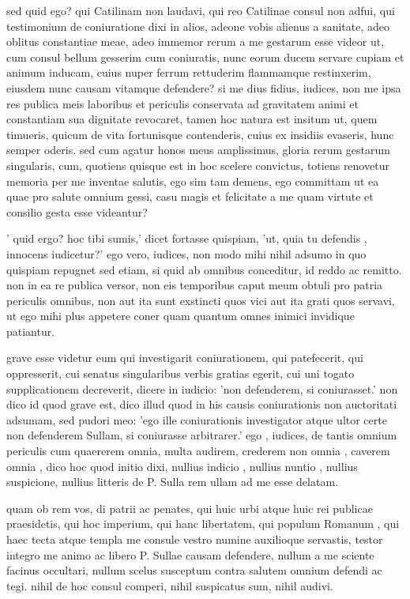  sed quid ego? qui Catilinam non laudavi, qui reo Catilinae consul non adfui, qui testimonium de coniuratione dixi in alios, adeone vobis alienus a sanitate, adeo oblitus constantiae meae, adeo immemor rerum a me gestarum esse videor ut, cum consul bellum gesserim cum coniuratis, nunc eorum ducem servare cupiam et animum inducam, cuius nuper ferrum rettuderim flammamque restinxerim, eiusdem nunc causam vitamque defendere? si me dius fidius, iudices, non me ipsa res publica meis laboribus et periculis conservata ad gravitatem animi et constantiam sua dignitate revocaret, tamen hoc natura est insitum ut, quem timueris, quicum de vita fortunisque contenderis, cuius ex insidiis evaseris, hunc semper oderis. sed cum agatur honos meus amplissimus, gloria rerum gestarum singularis, cum, quotiens quisque est in hoc scelere convictus, totiens renovetur memoria per me inventae salutis, ego sim tam demens, ego committam ut ea quae pro salute omnium gessi, casu magis et felicitate a me quam virtute et consilio gesta esse videantur?

 ' quid ergo? hoc tibi sumis,' dicet fortasse quispiam, 'ut, quia tu defendis , innocens iudicetur?' ego vero, iudices, non modo mihi nihil adsumo in quo quispiam repugnet sed etiam, si quid ab omnibus conceditur, id reddo ac remitto. non in ea re publica versor, non eis temporibus caput meum obtuli pro patria periculis omnibus, non aut ita sunt exstincti quos vici aut ita grati quos servavi, ut ego mihi plus appetere coner quam quantum omnes inimici invidique patiantur.

 grave esse videtur eum qui investigarit coniurationem, qui patefecerit, qui oppresserit, cui senatus singularibus verbis gratias egerit, cui uni togato supplicationem decreverit, dicere in iudicio: 'non defenderem, si coniurasset.' non dico id quod grave est, dico illud quod in his causis coniurationis non auctoritati adsumam, sed pudori meo: 'ego ille coniurationis investigator atque ultor certe non defenderem Sullam, si coniurasse arbitrarer.' ego , iudices, de tantis omnium periculis cum quaererem omnia, multa audirem, crederem non omnia , caverem omnia , dico hoc quod initio dixi, nullius indicio , nullius nuntio , nullius suspicione, nullius litteris de P. Sulla rem ullam ad me esse delatam.

 quam ob rem vos, di patrii ac penates, qui huic urbi atque huic rei publicae praesidetis, qui hoc imperium, qui hanc libertatem, qui populum Romanum , qui haec tecta atque templa me consule vestro numine auxilioque servastis, testor integro me animo ac libero P. Sullae causam defendere, nullum a me sciente facinus occultari, nullum scelus susceptum contra salutem omnium defendi ac tegi. nihil de hoc consul comperi, nihil suspicatus sum, nihil audivi.

